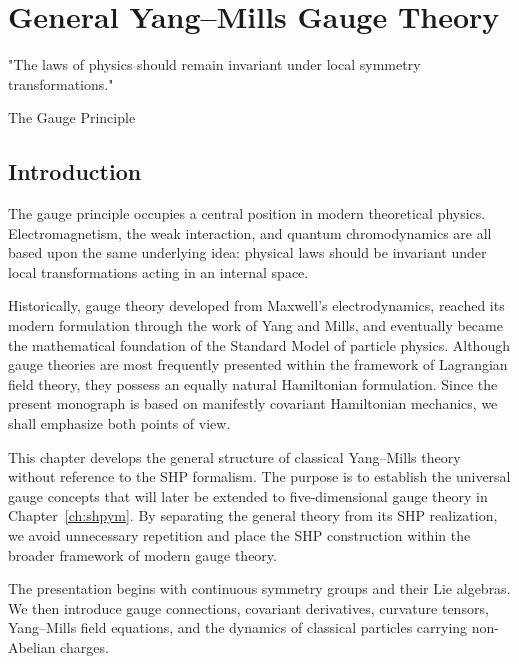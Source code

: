 \chapter{General Yang--Mills Gauge Theory}
\label{ch:yangmills}

\epigraph{%
"The laws of physics should remain invariant under local symmetry
transformations."
}{The Gauge Principle}

\section{Introduction}

The gauge principle occupies a central position in modern theoretical
physics. Electromagnetism, the weak interaction, and quantum
chromodynamics are all based upon the same underlying idea: physical
laws should be invariant under local transformations acting in an
internal space.

Historically, gauge theory developed from Maxwell's electrodynamics,
reached its modern formulation through the work of Yang and Mills, and
eventually became the mathematical foundation of the Standard Model of
particle physics. Although gauge theories are most frequently presented
within the framework of Lagrangian field theory, they possess an equally
natural Hamiltonian formulation. Since the present monograph is based on
manifestly covariant Hamiltonian mechanics, we shall emphasize both
points of view.

This chapter develops the general structure of classical Yang--Mills
theory without reference to the SHP formalism. The purpose is to
establish the universal gauge concepts that will later be extended to
five-dimensional gauge theory in Chapter~\ref{ch:shpym}. By separating
the general theory from its SHP realization, we avoid unnecessary
repetition and place the SHP construction within the broader framework
of modern gauge theory.

The presentation begins with continuous symmetry groups and their Lie
algebras. We then introduce gauge connections, covariant derivatives,
curvature tensors, Yang--Mills field equations, and the dynamics of
classical particles carrying non-Abelian charges.

